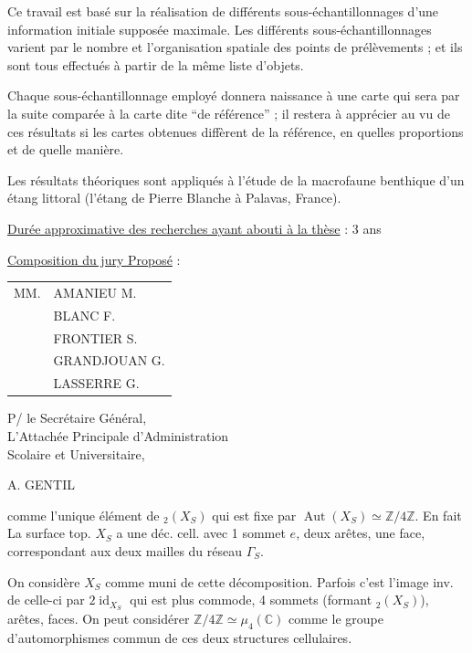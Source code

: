 Ce travail est basé sur la réalisation de différents sous-échantillonnages d'une information initiale supposée maximale. Les différents sous-échantillonnages varient par le nombre et l'organisation spatiale des points de prélèvements ; et ils sont tous effectués à partir de la même liste d'objets.

Chaque sous-échantillonnage employé donnera naissance à une carte qui sera par la suite comparée à la carte dite ``de référence'' ; il restera à apprécier au vu de ces résultats si les cartes obtenues diffèrent de la référence, en quelles proportions et de quelle manière.

Les résultats théoriques sont appliqués à l'étude de la macrofaune benthique d'un étang littoral (l'étang de Pierre Blanche à Palavas, France).

\uline{Durée approximative des recherches ayant abouti à la thèse} : 3 ans

\uline{Composition du jury Proposé} : \begin{tabular}[t]{ll}
MM. & AMANIEU M.\\
& BLANC F.\\
& FRONTIER S.\\
& GRANDJOUAN G.\\
& LASSERRE G.
\end{tabular}

\begin{flushright}
P/ le Secrétaire Général,\\
L'Attachée Principale d'Administration\\
Scolaire et Universitaire,


A. GENTIL
\end{flushright}



comme l'unique élément de \({}_2(X_S)\) qui est fixe par $\operatorname{Aut}(X_S)\simeq\mathbb Z/4\mathbb Z$. En fait
\inserted{\[
(X_S)^{\unsure{\deleted{i}|f}i}\overset{\mathrm{def}}{=}\{x\in X_S\deleted{\}} \mid ix\unsure{=|\simeq}x\}=\{e,\eta_S\}
\]}
 La surface top. $X_S$ a une déc. cell.  avec 1 sommet $e$, deux arêtes, une face,  correspondant aux deux mailles du réseau $\Gamma_S$.

On considère $X_S$ comme muni de cette décomposition. Parfois c'est l'image inv. de celle-ci par $2\operatorname{id}_{X_S}$ qui est plus commode, 4 sommets (formant \({}_2(X_S)\)),   arêtes,   faces. On peut considérer $\mathbb Z/4\mathbb Z\simeq\mu_4(\mathbb C)$ comme le groupe d'automorphismes commun de ces deux structures cellulaires.

